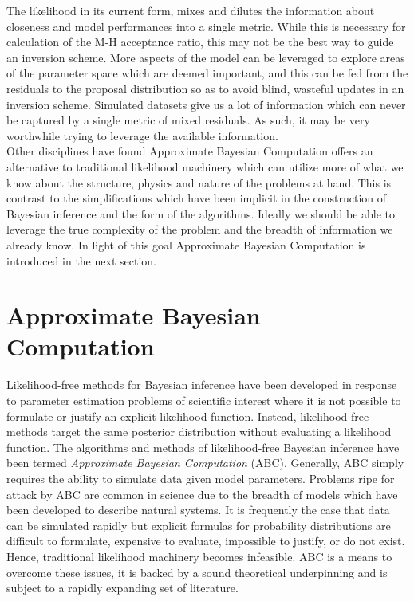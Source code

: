 The likelihood in its current form, mixes and dilutes the information about closeness and model performances into a single metric. While this is necessary for calculation of the M-H acceptance ratio, this may not be the best way to guide an inversion scheme. More aspects of the model can be leveraged to explore areas of the parameter space which are deemed important, and this can be fed from the residuals to the proposal distribution so as to avoid blind, wasteful updates in an inversion scheme. Simulated datasets give us a lot of information which can never be captured by a single metric of mixed residuals. As such, it may be very worthwhile trying to leverage the available information.\\

Other disciplines have found Approximate Bayesian Computation offers an alternative to traditional likelihood machinery which can utilize more of what we know about the structure, physics and nature of the problems at hand. This is contrast to the simplifications which have been implicit in the construction of Bayesian inference and the form of the algorithms. Ideally we should be able to leverage the true complexity of the problem and the breadth of information we already know. In light of this goal Approximate Bayesian Computation is introduced in the next section.  

\pagebreak



\section{Approximate Bayesian Computation}
\label{ApproximateBayesianComputation}

Likelihood-free methods for Bayesian inference have been developed in response to parameter estimation problems of scientific interest where it is not possible to formulate or justify an explicit likelihood function. Instead, likelihood-free methods target the same posterior distribution without evaluating a likelihood function. The algorithms and methods of likelihood-free Bayesian inference have been termed \textit{Approximate Bayesian Computation} (ABC). Generally, ABC simply requires the ability to simulate data given model parameters. Problems ripe for attack by ABC are common in science due to the breadth of models which have been developed to describe natural systems. It is frequently the case that data can be simulated rapidly but explicit formulas for probability distributions are difficult to formulate, expensive to evaluate, impossible to justify, or do not exist. Hence, traditional likelihood machinery becomes infeasible. ABC is a means to overcome these issues, it is backed by a sound theoretical underpinning and is subject to a rapidly expanding set of literature. \\

